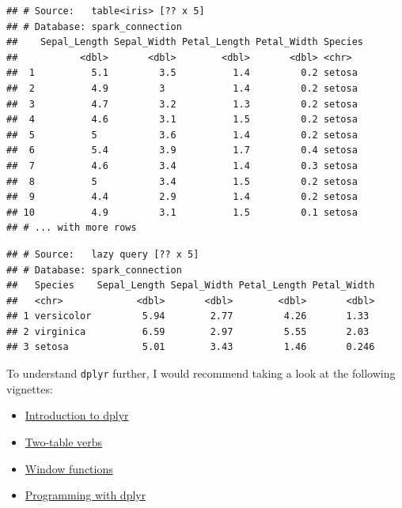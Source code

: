 \documentclass[]{book}
\newenvironment{Shaded}{\begin{snugshade}}{\end{snugshade}}
\newcommand{\CommentTok}[1]{\textcolor[rgb]{0.56,0.35,0.01}{\textit{#1}}}
\newcommand{\KeywordTok}[1]{\textcolor[rgb]{0.13,0.29,0.53}{\textbf{#1}}}
\newcommand{\NormalTok}[1]{#1}
\newcommand{\OperatorTok}[1]{\textcolor[rgb]{0.81,0.36,0.00}{\textbf{#1}}}
\newcommand{\StringTok}[1]{\textcolor[rgb]{0.31,0.60,0.02}{#1}}
\providecommand{\tightlist}{%
  \setlength{\itemsep}{0pt}\setlength{\parskip}{0pt}}
\theoremstyle{definition}
\theoremstyle{definition}
\theoremstyle{definition}
\theoremstyle{remark}
\begin{document}
\begin{verbatim}
## # Source:   table<iris> [?? x 5]
## # Database: spark_connection
##    Sepal_Length Sepal_Width Petal_Length Petal_Width Species
##           <dbl>       <dbl>        <dbl>       <dbl> <chr>  
##  1          5.1         3.5          1.4         0.2 setosa 
##  2          4.9         3            1.4         0.2 setosa 
##  3          4.7         3.2          1.3         0.2 setosa 
##  4          4.6         3.1          1.5         0.2 setosa 
##  5          5           3.6          1.4         0.2 setosa 
##  6          5.4         3.9          1.7         0.4 setosa 
##  7          4.6         3.4          1.4         0.3 setosa 
##  8          5           3.4          1.5         0.2 setosa 
##  9          4.4         2.9          1.4         0.2 setosa 
## 10          4.9         3.1          1.5         0.1 setosa 
## # ... with more rows
\end{verbatim}

\begin{Shaded}
\end{Shaded}

\begin{verbatim}
## # Source:   lazy query [?? x 5]
## # Database: spark_connection
##   Species    Sepal_Length Sepal_Width Petal_Length Petal_Width
##   <chr>             <dbl>       <dbl>        <dbl>       <dbl>
## 1 versicolor         5.94        2.77         4.26       1.33 
## 2 virginica          6.59        2.97         5.55       2.03 
## 3 setosa             5.01        3.43         1.46       0.246
\end{verbatim}

To understand \texttt{dplyr} further, I would recommend taking a look at
the following vignettes:

\begin{itemize}
\tightlist
\item
  \href{https://cran.r-project.org/web/packages/dplyr/vignettes/dplyr.html}{Introduction
  to dplyr}
\item
  \href{https://cran.r-project.org/web/packages/dplyr/vignettes/two-table.html}{Two-table
  verbs}
\item
  \href{https://cran.r-project.org/web/packages/dplyr/vignettes/window-functions.html}{Window
  functions}
\item
  \href{https://cran.r-project.org/web/packages/dplyr/vignettes/programming.html}{Programming
  with dplyr}
\end{itemize}
\end{document}

